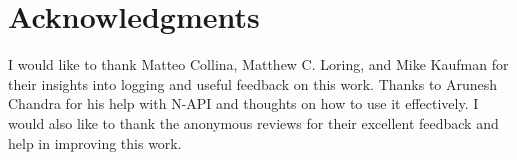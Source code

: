\documentclass[sigplan,10pt,screen]{acmart}
\begin{document}
\section*{Acknowledgments}
I would like to thank Matteo Collina, Matthew C. Loring, and Mike Kaufman for their insights into logging and 
useful feedback on this work. Thanks to Arunesh Chandra for his help with N-API and thoughts on how to 
use it effectively. I would also like to thank the anonymous reviews for their excellent feedback and help in improving this work.

\balance

{
\raggedright 

 
}
\end{document}
